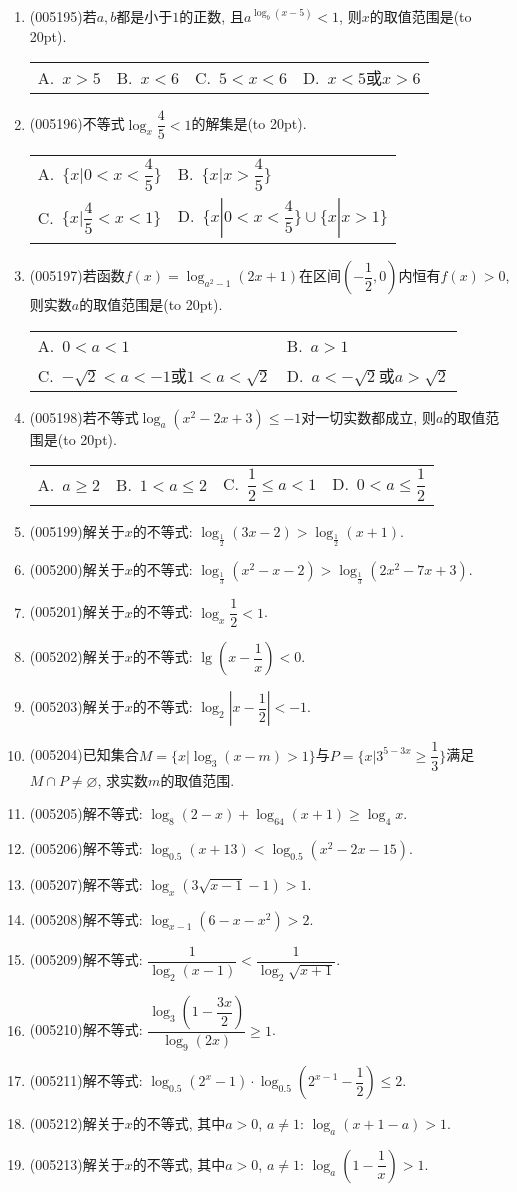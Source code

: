 \documentclass[10pt,a4paper]{article}
\newcommand{\bracket}[1]{(\hbox to #1pt{})}
\newcommand{\twoch}[4]{\par\begin{tabular}{p{.46\textwidth}p{.46\textwidth}}
A.~#1& B.~#2\\
C.~#3& D.~#4
\end{tabular}}
\newcommand{\fourch}[4]{\par\begin{tabular}{p{.23\textwidth}p{.23\textwidth}p{.23\textwidth}p{.23\textwidth}}
A.~#1 &B.~#2& C.~#3& D.~#4
\end{tabular}}
\begin{document}
\begin{enumerate}[1.]
\item {\tiny (005195)}若$a,b$都是小于$1$的正数, 且$a^{\log_b(x-5)}<1$, 则$x$的取值范围是\bracket{20}.
\fourch{$x>5$}{$x<6$}{$5<x<6$}{$x<5$或$x>6$}
\item {\tiny (005196)}不等式$\log_x\dfrac 45<1$的解集是\bracket{20}.
\twoch{$\{x|0<x<\dfrac 45\}$}{$\{x|x>\dfrac 45\}$}{$\{x|\dfrac 45<x<1\}$}{$\{x|0<x<\dfrac 45\}\cup \{x|x>1\}$}
\item {\tiny (005197)}若函数$f(x)=\log_{a^2-1}(2x+1)$在区间$(-\dfrac 12,0)$内恒有$f(x)>0$, 则实数$a$的取值范围是\bracket{20}.
\twoch{$0<a<1$}{$a>1$}{$-\sqrt 2<a<-1$或$1<a<\sqrt 2$}{$a<-\sqrt 2$或$a>\sqrt 2$}
\item {\tiny (005198)}若不等式$\log_a(x^2-2x+3)\le -1$对一切实数都成立, 则$a$的取值范围是\bracket{20}.
\fourch{$a\ge 2$}{$1<a\le 2$}{$\dfrac 12\le a<1$}{$0<a\le \dfrac 12$}
\item {\tiny (005199)}解关于$x$的不等式: $\log_{\frac 12}(3x-2)>\log_{\frac 12}(x+1)$.
\item {\tiny (005200)}解关于$x$的不等式: $\log_{\frac 13}(x^2-x-2)>\log_{\frac 13}(2x^2-7x+3)$.
\item {\tiny (005201)}解关于$x$的不等式: $\log_x\dfrac 12<1$.
\item {\tiny (005202)}解关于$x$的不等式: $\lg (x-\dfrac 1x)<0$.
\item {\tiny (005203)}解关于$x$的不等式: $\log_2|x-\dfrac 12|<-1$.
\item {\tiny (005204)}已知集合$M=\{x|\log_3(x-m)>1\}$与$P=\{x|3^{5-3x} \ge \dfrac 13\}$满足$M\cap P\ne \varnothing$, 求实数$m$的取值范围.
\item {\tiny (005205)}解不等式: $\log_8(2-x)+\log_{64}(x+1)\ge \log_4x$.
\item {\tiny (005206)}解不等式: $\log_{0.5}(x+13)<\log_{0.5}(x^2-2x-15)$.
\item {\tiny (005207)}解不等式: $\log_x(3\sqrt{x-1}-1)>1$.
\item {\tiny (005208)}解不等式: $\log_{x-1}(6-x-x^2)>2$.
\item {\tiny (005209)}解不等式: $\dfrac 1{\log_2(x-1)}<\dfrac 1{\log_2\sqrt{x+1}}$.
\item {\tiny (005210)}解不等式: $\dfrac{\log_3(1-\dfrac{3x}2)}{\log_9(2x)}\ge 1$.
\item {\tiny (005211)}解不等式: $\log_{0.5}({2^x}-1)\cdot \log_{0.5}({2^{x-1}}-\dfrac 12)\le 2$.
\item {\tiny (005212)}解关于$x$的不等式, 其中$a>0$, $a\ne 1$: $\log_a(x+1-a)>1$.
\item {\tiny (005213)}解关于$x$的不等式, 其中$a>0$, $a\ne 1$: $\log_a(1-\dfrac 1x)>1$.

\end{enumerate}
\end{document}
